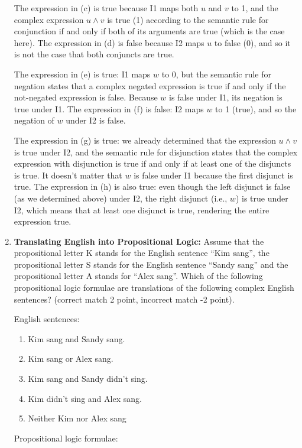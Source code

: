 \documentclass[a4,11pt]{article}
\newcommand{\6}{\mbox{$[\hspace*{-.6mm}[$}}
\newcommand{\9}{\mbox{$]\hspace*{-.6mm}]$}}
\begin{document}
\begin{enumerate}[leftmargin = 12pt]
The expression in (c) is true because I1 maps both $u$ and $v$ to 1, and the complex expression $u \wedge v$ is true (1) according to the semantic rule for conjunction if and only if both of its arguments are true (which is the case here). The expression in (d) is false because I2 maps $u$ to false (0), and so it is not the case that both conjuncts are true.

The expression in (e) is true: I1 maps $w$ to 0, but the semantic rule for negation states that a complex negated expression is true if and only if the not-negated expression is false. Because $w$ is false under I1, its negation is true under I1. The expression in (f) is false: I2 maps $w$ to 1 (true), and so the negation of $w$ under I2 is false.

The expression in (g) is true: we already determined that the expression $u \wedge v$ is true under I2, and the semantic rule for disjunction states that the complex expression with disjunction is true if and only if at least one of the disjuncts is true. It doesn't matter that $w$ is false under I1 because the first disjunct is true. The expression in (h) is also true: even though the left disjunct is false (as we determined above) under I2, the right disjunct (i.e., $w$) is true under I2, which means that at least one disjunct is true, rendering the entire expression true.


\item {\bf Translating English into Propositional Logic:} Assume that the propositional letter K stands for the English sentence ``Kim sang'', the propositional letter S stands for the English sentence ``Sandy sang'' and the propositional letter A stands for ``Alex sang''. Which of the following propositional logic formulae are translations of the following complex English sentences? (correct match 2 point, incorrect match -2 point).

English sentences:

\begin{enumerate}[noitemsep]
\item Kim sang and Sandy sang. 
\item Kim sang or Alex sang.
\item Kim sang and Sandy didn't sing.
\item Kim didn't sing and Alex sang.
\item Neither Kim nor Alex sang
\end{enumerate}

Propositional logic formulae:


\end{enumerate}
\end{document}
